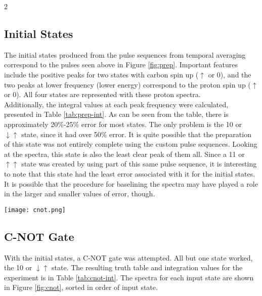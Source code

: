 \documentclass[11pt]{article}
\begin{document}
\begin{multicols}{2}
  \subsection{Initial States}
  The initial states produced from the pulse sequences from temporal averaging correspond to the pulses seen above in Figure \ref{fig:prep}. Important features include the positive peaks for two states with carbon spin up ($\uparrow$ or 0), and the two peaks at lower frequency (lower energy) correspond to the proton spin up ($\uparrow$ or 0). All four states are represented with these proton spectra. \\

Additionally, the integral values at each peak frequency were calculated, presented in Table \ref{tab:prep-int}. As can be seen from the table, there is approximately 20\%-25\% error for most states. The only problem is the 10 or $\downarrow\uparrow$ state, since it had over 50\% error. It is quite possible that the preparation of this state was not entirely complete using the custom pulse sequences. Looking at the spectra, this state is also the least clear peak of them all. Since a 11 or $\uparrow\uparrow$ state was created by using part of this same pulse sequence, it is interesting to note that this state had the least error associated with it for the initial states. It is possible that the procedure for baselining the spectra may have played a role in the larger and smaller values of error, though.

\begin{figure*}
  \begin{center}
    \texttt{[image: cnot.png]}
  \end{center}
  \caption{Normalized spectra for the C-NOT logic gate, only one state was incorrect}
  \label{fig:cnot}
\end{figure*}

  \subsection{C-NOT Gate}
  With the initial states, a C-NOT gate was attempted. All but one state worked, the 10 or $\downarrow\uparrow$ state. The resulting truth table and integration values for the experiment is in Table \ref{tab:cnot-int}. The spectra for each input state are shown in Figure \ref{fig:cnot}, sorted in order of input state.


\end{multicols}
\end{document}
